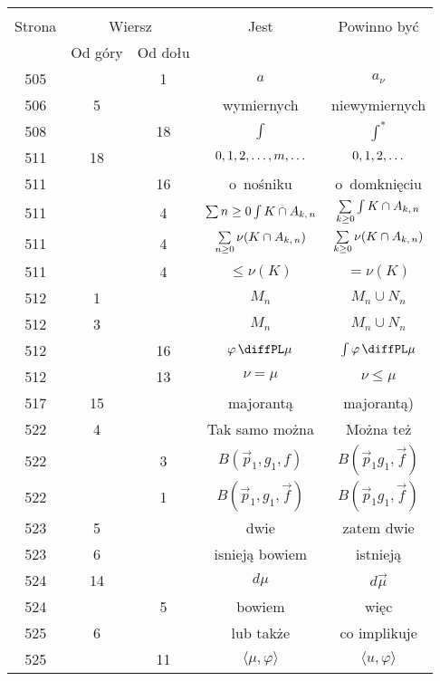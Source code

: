 \documentclass[a4paper,11pt]{article}
\begin{document}
\begin{center}
  \begin{tabular}{|c|c|c|c|c|}
    \hline
    & \multicolumn{2}{c|}{} & & \\
    Strona & \multicolumn{2}{c|}{Wiersz} & Jest
                              & Powinno być \\ \cline{2-3}
    & Od góry & Od dołu & & \\
    \hline
    505 & &  1 & $a$ & $a_{ \nu }$ \\
    506 &  5 & & wymiernych & niewymiernych \\
    508 & & 18 & $\int$ & $\int^{ * }$ \\
    511 & 18 & & $0, 1, 2, \ldots, m, \ldots$ & $0, 1, 2, \ldots$ \\
    511 & & 16 & o~nośniku & o~domknięciu \\
    511 & &  4 & $\sum\limits{ n \geq 0 } \int\limits{ K \cap A_{ k,\, n } }$
           & $\sum\limits_{ k \geq 0 } \int\limits{ K \cap A_{ k,\, n } }$ \\
    511 & &  4 & $\sum\limits_{ n \geq 0 } \nu( K \cap A_{ k,\, n } )$
           & $\sum\limits_{ k \geq 0 } \nu( K \cap A_{ k,\, n } )$ \\
    511 & &  4 & $\leq \nu( K )$ & $= \nu( K )$ \\
    512 &  1 & & $M_{ n }$ & $M_{ n } \cup N_{ n }$ \\
    512 &  3 & & $M_{ n }$ & $M_{ n } \cup N_{ n }$ \\
    512 & & 16 & $\varphi\, \diffPL \mu$ & $\int \varphi\, \diffPL \mu$ \\
    512 & & 13 & $\nu = \mu$ & $\nu \leq \mu$ \\
    517 & 15 & & majorantą & majorantą) \\
    522 &  4 & & Tak samo można & Można też \\
    522 & &  3 & $B( \vec{ p }_{ 1 }, g_{ 1 }, f )$
           & $B( \vec{ p }_{ 1 } g_{ 1 }, \vec{ f } )$ \\
    522 & &  1 & $B( \vec{ p }_{ 1 }, g_{ 1 }, \vec{ f } )$
           & $B( \vec{ p }_{ 1 } g_{ 1 }, \vec{ f } )$ \\
    523 &  5 & & dwie & zatem dwie \\
    523 &  6 & & isnieją bowiem & istnieją \\
    524 & 14 & & $d \mu$ & $d \vec{ \mu }$ \\
    524 & &  5 & bowiem & więc \\
    525 &  6 & & lub także & co implikuje \\
    525 & & 11 & $\langle \mu, \varphi \rangle$
           & $\langle u, \varphi \rangle$ \\

\end{tabular}
\end{center}
\end{document}
